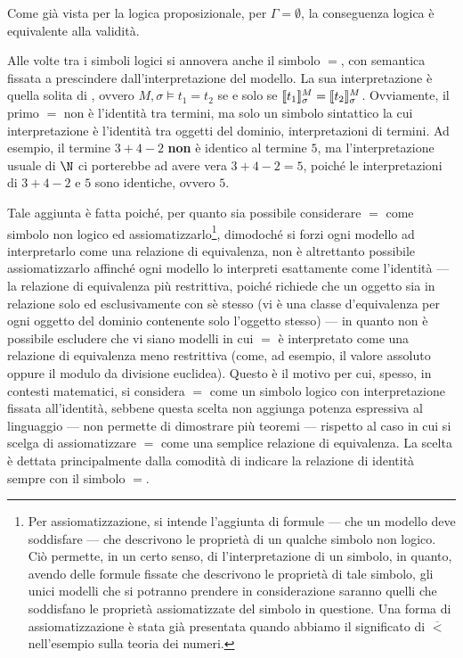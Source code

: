 Come già vista per la logica proposizionale, per \(\Gamma = \emptyset\), la conseguenza logica è equivalente alla validità.

Alle volte tra i simboli logici si annovera anche il simbolo \(=\), con semantica fissata a prescindere dall'interpretazione del modello. La sua interpretazione è quella solita di , ovvero \(M,\sigma\models t_1 = t_2\) se e solo se \(\den{t_1}[M][\sigma] = \den{t_2}[M][\sigma]\). Ovviamente, il primo \(=\) non è l'identità tra termini, ma solo un simbolo sintattico la cui interpretazione è l'identità tra oggetti del dominio, interpretazioni di termini. Ad esempio, il termine \(3+4-2\) \textbf{non} è identico al termine \(5\), ma l'interpretazione usuale di \(\N\) ci porterebbe ad avere vera \(3+4-2 = 5\), poiché le interpretazioni di \(3+4-2\) e \(5\) sono identiche, ovvero \(5\).

Tale aggiunta è fatta poiché, per quanto sia possibile considerare \(=\) come simbolo non logico ed assiomatizzarlo\footnote{Per assiomatizzazione, si intende l'aggiunta di formule --- che un modello deve soddisfare --- che descrivono le proprietà di un qualche simbolo non logico. Ciò permette, in un certo senso, di  l'interpretazione di un simbolo, in quanto, avendo delle formule fissate che descrivono le proprietà di tale simbolo, gli unici modelli che si potranno prendere in considerazione saranno quelli che soddisfano le proprietà assiomatizzate del simbolo in questione. Una forma di assiomatizzazione è stata già presentata quando abbiamo  il significato di \(\overline{<}\) nell'esempio sulla teoria dei numeri.}, dimodoché si forzi ogni modello ad interpretarlo come una relazione di equivalenza, non è altrettanto possibile assiomatizzarlo affinché ogni modello lo interpreti esattamente come l'identità --- la relazione di equivalenza più restrittiva, poiché richiede che un oggetto sia in relazione solo ed esclusivamente con sè stesso (vi è una classe d'equivalenza per ogni oggetto del dominio contenente solo l'oggetto stesso) --- in quanto non è possibile escludere che vi siano modelli in cui \(=\) è interpretato come una relazione di equivalenza meno restrittiva (come, ad esempio, il valore assoluto oppure il modulo da divisione euclidea). Questo è il motivo per cui, spesso, in contesti matematici, si considera \(=\) come un simbolo logico con interpretazione fissata all'identità, sebbene questa scelta non aggiunga potenza espressiva al linguaggio --- non permette di dimostrare più teoremi --- rispetto al caso in cui si scelga di assiomatizzare \(=\) come una semplice relazione di equivalenza. La scelta è dettata principalmente dalla comodità di indicare la relazione di identità sempre con il simbolo \(=\).

